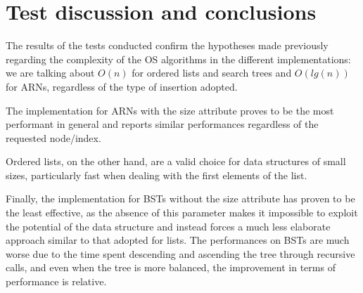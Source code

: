 \documentclass[11pt]{article}
\begin{document}
\section{Test discussion and conclusions}
The results of the tests conducted confirm the hypotheses made previously regarding the complexity of the OS algorithms in the different implementations: we are talking about $O(n)$ for ordered lists and search trees and $O(lg(n))$ for ARNs, regardless of the type of insertion adopted.

The implementation for ARNs with the size attribute proves to be the most performant in general and reports similar performances regardless of the requested node/index.

Ordered lists, on the other hand, are a valid choice for data structures of small sizes, particularly fast when dealing with the first elements of the list.

Finally, the implementation for BSTs without the size attribute has proven to be the least effective, as the absence of this parameter makes it impossible to exploit the potential of the data structure and instead forces a much less elaborate approach similar to that adopted for lists. The performances on BSTs are much worse due to the time spent descending and ascending the tree through recursive calls, and even when the tree is more balanced, the improvement in terms of performance is relative.
\end{document}
